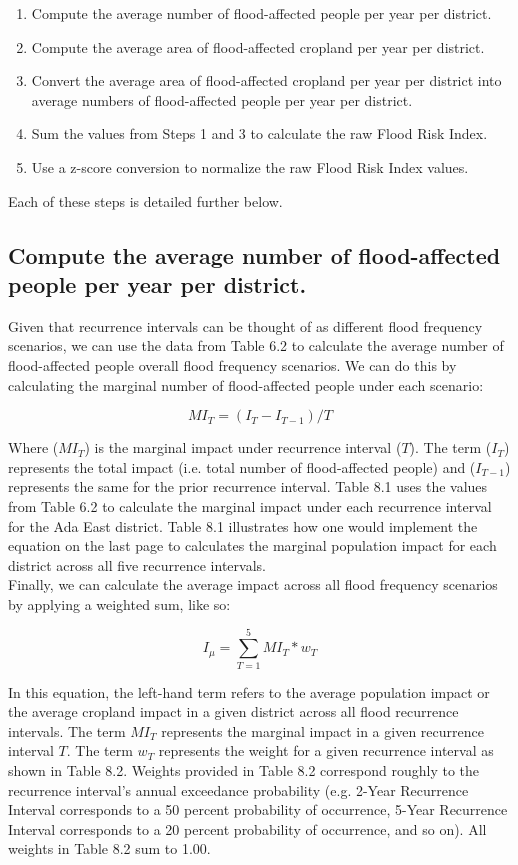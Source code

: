 \begin{enumerate}
  \item Compute the average number of flood-affected people per year per district.
  \item Compute the average area of flood-affected cropland per year per district.
  \item Convert the average area of flood-affected cropland per year per district into average numbers of flood-affected people per year per district.
  \item Sum the values from Steps 1 and 3 to calculate the raw Flood Risk Index.
  \item Use a z-score conversion to normalize the raw Flood Risk Index values.
\end{enumerate}

Each of these steps is detailed further below.

\subsection{Compute the average number of flood-affected people per year per district.}

Given that recurrence intervals can be thought of as different flood frequency scenarios, we can use the data from Table 6.2 to calculate the average number of flood-affected people overall flood frequency scenarios. We can do this by calculating the marginal number of flood-affected people under each scenario:

\[ MI_T = (I_T - I_{T-1}) / T \]

Where (\({MI_T}\)) is the marginal impact under recurrence interval (\({T}\)). The term (\({I_T}\)) represents the total impact (i.e. total number of flood-affected people) and (\(I_{T-1}\)) represents the same for the prior recurrence interval. Table 8.1 uses the values from Table 6.2 to calculate the marginal impact under each recurrence interval for the Ada East district. Table 8.1 illustrates how one would implement the equation on the last page to calculates the marginal population impact for each district across all five recurrence intervals.\\

Finally, we can calculate the average impact across all flood frequency scenarios by applying a weighted sum, like so:

\[ I_{\mu} = \sum_{T=1}^{5} MI_T * w_T \]

In this equation, the left-hand term refers to the average population impact or the average cropland impact in a given district across all flood recurrence intervals. The term \({MI_T}\) represents the marginal impact in a given recurrence interval \({T}\). The term \({w_T}\) represents the weight for a given recurrence interval as shown in Table 8.2. Weights provided in Table 8.2 correspond roughly to the recurrence interval's annual exceedance probability (e.g. 2-Year Recurrence Interval corresponds to a 50 percent probability of occurrence, 5-Year Recurrence Interval corresponds to a 20 percent probability of occurrence, and so on). All weights in Table 8.2 sum to 1.00.\\

